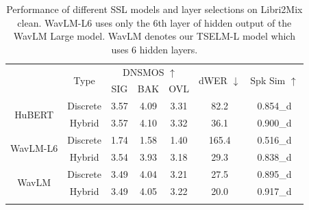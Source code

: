 \documentclass[conference]{IEEEtran}
\begin{document}
  \begin{table}
    \caption{Performance of different SSL models and layer selections on Libri2Mix clean. WavLM-L6 uses only the 6th layer of hidden output of the WavLM Large model. WavLM denotes our TSELM-L model which uses 6 hidden layers. 
            }
            \vspace{-15pt}
    \renewcommand{\arraystretch}{1.1}
    \begin{center}
      \setlength{\tabcolsep}{5pt}
        \begin{tabular}{ccccccc}
            \Xhline{2\arrayrulewidth} %
            \multirow{2}{*}{SSL-Model} & \multirow{2}{*}{Type} & \multicolumn{3}{c}{ DNSMOS $\uparrow$} & \multirow{2}{*}{dWER $\downarrow$} & \multirow{2}{*}{Spk Sim $\uparrow$} \\
            \cline{3-5}
                                                       &                             & SIG     & BAK     & OVL    &                       &                          \\ 
            \hline
            \multirow{2}{*}{HuBERT}                              &  Discrete                          & 3.57    & 4.09    & 3.31   & 82.2                & 0.854\_d                        \\
                                             &  Hybrid                          & 3.57    & 4.10    & 3.32   & 36.1                & 0.900\_d                        \\
            \hline
            \multirow{2}{*}{WavLM-L6}                              &  Discrete                          & 1.74    & 1.58    & 1.40   & 165.4                & 0.516\_d                        \\
            &  Hybrid                          & 3.54    & 3.93    & 3.18   & 29.3                & 0.838\_d                        \\
            \hline
            \multirow{2}{*}{WavLM}                                     &  Discrete                          & 3.49    & 4.04    & 3.21   & 27.5                & 0.895\_d                        \\
                                              &  Hybrid                          & 3.49    & 4.05    & 3.22   & 20.0                & 0.917\_d                        \\
            
            \Xhline{2\arrayrulewidth} %
            \end{tabular}
            \linebreak
            \label{hubert_wavlm_6}
      \end{center}
      \vspace{-17pt}
    \end{table}
\end{document}
